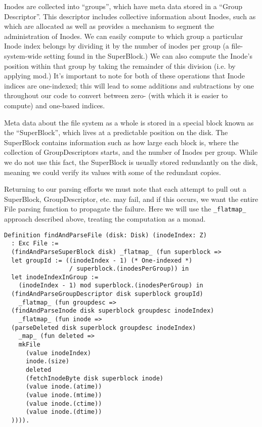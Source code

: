 \documentclass[nocopyrightspace]{sigplanconf}
\begin{document}
Inodes are collected into ``groups'', which have meta data stored in a ``Group
Descriptor''. This descriptor includes collective information about Inodes,
such as which are allocated as well as provides a mechanism to segment the
administration of Inodes. We can easily compute to which group a particular
Inode index belongs by dividing it by the number of inodes per group (a
file-system-wide setting found in the SuperBlock.) We can also compute the
Inode's position within that group by taking the remainder of this division
(i.e. by applying mod.) It's important to note for both of these operations
that Inode indices are one-indexed; this will lead to some additions and
subtractions by one throughout our code to convert between zero- (with which
it is easier to compute) and one-based indices.

Meta data about the file system as a whole is stored in a special block known
as the ``SuperBlock'', which lives at a predictable position on the disk. The
SuperBlock contains information such as how large each block is, where the
collection of GroupDescriptors starts, and the number of Inodes per group.
While we do not use this fact, the SuperBlock is usually stored redundantly on
the disk, meaning we could verify its values with some of the redundant
copies.

Returning to our parsing efforts we must note that each attempt to pull out a
SuperBlock, GroupDescriptor, etc. may fail, and if this occurs, we want the
entire File parsing function to propagate the failure. Here we will use the
{\tt \_flatmap\_} approach described above, treating the computation as a
monad.

\begin{lstlisting}
Definition findAndParseFile (disk: Disk) (inodeIndex: Z) 
  : Exc File :=
  (findAndParseSuperBlock disk) _flatmap_ (fun superblock =>
  let groupId := ((inodeIndex - 1) (* One-indexed *)
                  / superblock.(inodesPerGroup)) in
  let inodeIndexInGroup := 
    (inodeIndex - 1) mod superblock.(inodesPerGroup) in
  (findAndParseGroupDescriptor disk superblock groupId) 
    _flatmap_ (fun groupdesc =>
  (findAndParseInode disk superblock groupdesc inodeIndex) 
    _flatmap_ (fun inode =>
  (parseDeleted disk superblock groupdesc inodeIndex) 
    _map_ (fun deleted =>
    mkFile
      (value inodeIndex)
      inode.(size)
      deleted
      (fetchInodeByte disk superblock inode)
      (value inode.(atime))
      (value inode.(mtime))
      (value inode.(ctime))
      (value inode.(dtime))
  )))).
\end{lstlisting}
\end{document}

